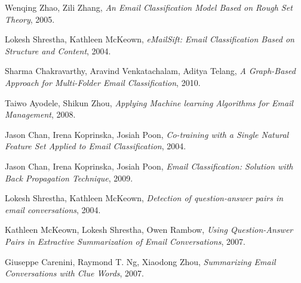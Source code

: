 \documentclass[12pt]{article}
\begin{document}
\begin{thebibliography}{99}
  Wenqing Zhao,
  Zili Zhang,
  \emph{An Email Classification Model Based on Rough Set Theory},
  2005.

  Lokesh Shrestha,
  Kathleen McKeown,
  \emph{eMailSift: Email Classification Based on Structure and Content},
  2004.

  Sharma Chakravarthy,
  Aravind Venkatachalam,
  Aditya Telang,
  \emph{ A Graph-Based Approach for Multi-Folder Email Classification},
  2010.

  Taiwo Ayodele,
  Shikun Zhou,
  \emph{Applying Machine learning Algorithms for Email Management},
  2008.

  Jason Chan,
  Irena Koprinska,
  Josiah Poon,
  \emph{Co-training with a Single Natural Feature Set Applied to Email Classification},
  2004.

  Jason Chan,
  Irena Koprinska,
  Josiah Poon,
  \emph{Email Classification: Solution with Back Propagation Technique},
  2009.

  Lokesh Shrestha,
  Kathleen McKeown,
  \emph{Detection of question-answer pairs in email conversations},
  2004.

  Kathleen McKeown,
  Lokesh Shrestha,
  Owen Rambow,
  \emph{Using Question-Answer Pairs in Extractive Summarization of Email Conversations},
  2007.

  Giuseppe Carenini,
  Raymond T. Ng,
  Xiaodong Zhou,
  \emph{Summarizing Email Conversations with Clue Words},
  2007.
\end{thebibliography}
\end{document}
